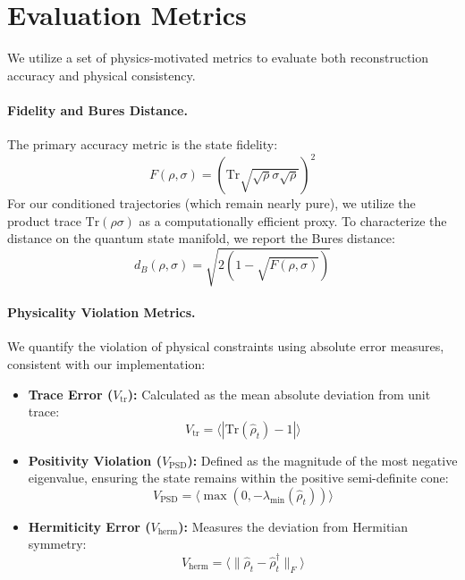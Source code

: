 \documentclass{article} %
\begin{document}
\section{Evaluation Metrics}
\label{app:metrics}

We utilize a set of physics-motivated metrics to evaluate both reconstruction accuracy and physical consistency.

\paragraph{Fidelity and Bures Distance.}
The primary accuracy metric is the state fidelity:
\begin{equation}
F(\rho, \sigma) = \left(\text{Tr}\sqrt{\sqrt{\rho}\sigma\sqrt{\rho}}\right)^2
\end{equation}
For our conditioned trajectories (which remain nearly pure), we utilize the product trace $\text{Tr}(\rho\sigma)$ as a computationally efficient proxy. To characterize the distance on the quantum state manifold, we report the Bures distance:
\begin{equation}
d_B(\rho, \sigma) = \sqrt{2(1 - \sqrt{F(\rho, \sigma)})}
\end{equation}

\paragraph{Physicality Violation Metrics.}
We quantify the violation of physical constraints using absolute error measures, consistent with our implementation:
\begin{itemize}
\item \textbf{Trace Error ($V_{\text{tr}}$):} Calculated as the mean absolute deviation from unit trace:
\begin{equation}
V_{\text{tr}} = \langle |\text{Tr}(\hat{\rho}_t) - 1| \rangle
\end{equation}

\item \textbf{Positivity Violation ($V_{\text{PSD}}$):} Defined as the magnitude of the most negative eigenvalue, ensuring the state remains within the positive semi-definite cone:
\begin{equation}
V_{\text{PSD}} = \langle \max(0, -\lambda_{\min}(\hat{\rho}_t)) \rangle
\end{equation}

\item \textbf{Hermiticity Error ($V_{\text{herm}}$):} Measures the deviation from Hermitian symmetry:
\begin{equation}
V_{\text{herm}} = \langle \|\hat{\rho}_t - \hat{\rho}_t^\dagger\|_F \rangle
\end{equation}
\end{itemize}
\end{document}

